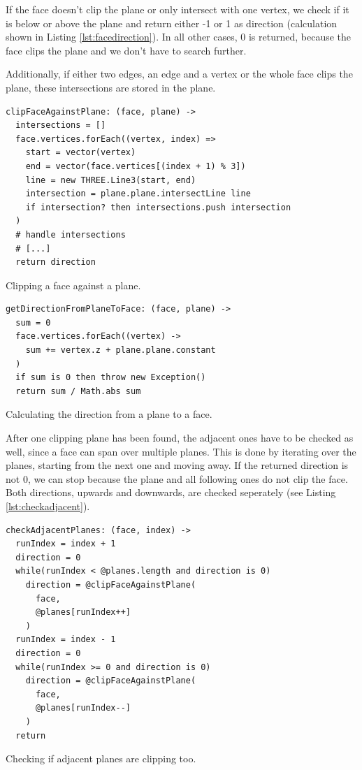 \documentclass[../ClassicThesis.tex]{subfiles}
\begin{document}
If the face doesn't clip the plane or only intersect with one vertex, we check if it is below or above the plane and return either -1 or 1 as direction (calculation shown in Listing \ref{lst:facedirection}). In all other cases, 0 is returned, because the face clips the plane and we don't have to search further. 

Additionally, if either two edges, an edge and a vertex or the whole face clips the plane, these intersections are stored in the plane.

\begin{listing}[ht]
\begin{verbatim}
clipFaceAgainstPlane: (face, plane) ->
  intersections = []
  face.vertices.forEach((vertex, index) =>
    start = vector(vertex)
    end = vector(face.vertices[(index + 1) % 3])
    line = new THREE.Line3(start, end)
    intersection = plane.plane.intersectLine line
    if intersection? then intersections.push intersection
  )
  # handle intersections
  # [...]
  return direction
\end{verbatim}
\caption{Clipping a face against a plane.}
\label{lst:clipfaceplane}
\end{listing}

\begin{listing}[ht]
\begin{verbatim}
getDirectionFromPlaneToFace: (face, plane) ->
  sum = 0
  face.vertices.forEach((vertex) ->
    sum += vertex.z + plane.plane.constant
  )
  if sum is 0 then throw new Exception()
  return sum / Math.abs sum
\end{verbatim}
\caption{Calculating the direction from a plane to a face.}
\label{lst:facedirection}
\end{listing}

After one clipping plane has been found, the adjacent ones have to be checked as well, since a face can span over multiple planes. This is done by iterating over the planes, starting from the next one and moving away. If the returned direction is not 0, we can stop because the plane and all following ones do not clip the face. Both directions, upwards and downwards, are checked seperately (see Listing \ref{lst:checkadjacent}).

\begin{listing}[ht]
\begin{verbatim}
checkAdjacentPlanes: (face, index) ->
  runIndex = index + 1
  direction = 0
  while(runIndex < @planes.length and direction is 0)
    direction = @clipFaceAgainstPlane(
      face, 
      @planes[runIndex++]
    )
  runIndex = index - 1
  direction = 0
  while(runIndex >= 0 and direction is 0)
    direction = @clipFaceAgainstPlane(
      face, 
      @planes[runIndex--]
    )
  return
\end{verbatim}
\caption{Checking if adjacent planes are clipping too.}
\label{lst:checkadjacent}
\end{listing}
\end{document}
